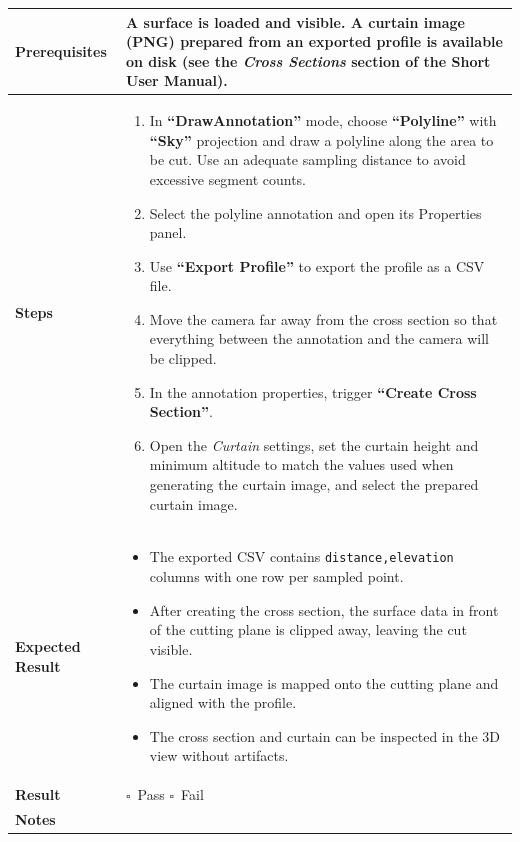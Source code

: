 \documentclass[a4paper,11pt]{article}
\newcommand{\checkbox}{$\square$}
\newcommand{\button}[1]{\textbf{``#1''}}
\newcommand{\menu}[1]{\textit{#1}}
\begin{document}
	\begin{tabularx}{\textwidth}{lX}
		\toprule
		\textbf{Prerequisites} & A surface is loaded and visible. A curtain image (PNG) prepared from an exported profile is available on disk (see the \menu{Cross Sections} section of the Short User Manual). \\
		\midrule
		\textbf{Steps} &
		\begin{enumerate}[leftmargin=*, nosep]
			\item In \button{DrawAnnotation} mode, choose \button{Polyline} with \button{Sky} projection and draw a polyline along the area to be cut. Use an adequate sampling distance to avoid excessive segment counts.
			\item Select the polyline annotation and open its Properties panel.
			\item Use \button{Export Profile} to export the profile as a CSV file.
			\item Move the camera far away from the cross section so that everything between the annotation and the camera will be clipped.
			\item In the annotation properties, trigger \button{Create Cross Section}.
			\item Open the \menu{Curtain} settings, set the curtain height and minimum altitude to match the values used when generating the curtain image, and select the prepared curtain image.
		\end{enumerate} \\
		\midrule
		\textbf{Expected Result} &
		\begin{itemize}[leftmargin=*, nosep]
			\item The exported CSV contains \texttt{distance,elevation} columns with one row per sampled point.
			\item After creating the cross section, the surface data in front of the cutting plane is clipped away, leaving the cut visible.
			\item The curtain image is mapped onto the cutting plane and aligned with the profile.
			\item The cross section and curtain can be inspected in the 3D view without artifacts.
		\end{itemize} \\
		\midrule
		\textbf{Result} & \checkbox~Pass \quad \checkbox~Fail \\
		\midrule
		\textbf{Notes} & \\[1.5cm]
		\bottomrule
	\end{tabularx}
	
\end{document}
